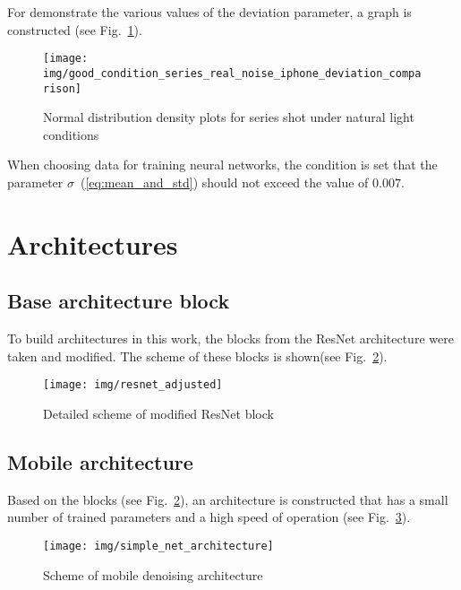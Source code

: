 \documentclass[runningheads]{llncs}
\begin{document}
For demonstrate the various values of the deviation parameter, a graph is constructed (see Fig.~\ref{fig:distribuion_real_noise_good_condition}).


\begin{figure}
	\centering
	\texttt{[image: img/good\_condition\_series\_real\_noise\_iphone\_deviation\_comparison]}
	\caption{Normal distribution density plots for series shot under natural light conditions}
	\label{fig:distribuion_real_noise_good_condition}
\end{figure}


When choosing data for training neural networks, the condition is set that the parameter $\sigma$~(\ref{eq:mean_and_std}) should not exceed the value of $0.007$.


\section{Architectures}

\subsection{Base architecture block}

To build architectures in this work, the blocks from the ResNet architecture were taken and modified. The scheme of these blocks is shown(see Fig.~\ref{fig:detail_adjuster_resnet_block}).

\begin{figure}
	\centering
	\texttt{[image: img/resnet\_adjusted]}
	\caption{Detailed scheme of modified ResNet block} 
	\label{fig:detail_adjuster_resnet_block}
\end{figure}

\subsection{Mobile architecture}

Based on the blocks (see Fig.~\ref{fig:detail_adjuster_resnet_block}), an architecture is constructed that has a small number of trained parameters and a high speed of operation (see Fig.~\ref{fig:simple_net_architecture}).

\begin{figure}
	\centering
	\texttt{[image: img/simple\_net\_architecture]}
	\caption{Scheme of mobile denoising architecture} 
	\label{fig:simple_net_architecture}
\end{figure}
\end{document}
